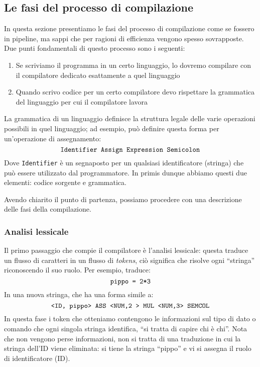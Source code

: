 \documentclass[class=book, crop=false, oneside, 12pt]{standalone}
\begin{document}
\subsection{Le fasi del processo di compilazione}
In questa sezione presentiamo le fasi del processo di compilazione come se fossero in pipeline, ma sappi che per ragioni di efficienza vengono spesso sovrapposte. Due punti fondamentali di questo processo sono i seguenti:
\begin{enumerate}
    \item Se scriviamo il programma in un certo linguaggio, lo dovremo compilare con il compilatore dedicato esattamente a quel linguaggio
    \item Quando scrivo codice per un certo compilatore devo rispettare la grammatica del linguaggio per cui il compilatore lavora
\end{enumerate}
La grammatica di un linguaggio definisce la struttura legale delle varie operazioni possibili in quel linguaggio; ad esempio, può definire questa forma per un’operazione di assegnamento:
\begin{equation*}
	\textrm{\texttt{Identifier Assign Expression Semicolon}}
\end{equation*}
Dove \texttt{Identifier} è un segnaposto per un qualsiasi identificatore (stringa) che può essere utilizzato dal programmatore.
In primis dunque abbiamo questi due elementi: codice sorgente e grammatica.

Avendo chiarito il punto di partenza, possiamo procedere con una descrizione delle fasi della compilazione.

\subsubsection{Analisi lessicale}
Il primo passaggio che compie il compilatore è l’analisi lessicale: questa traduce un flusso di caratteri in un flusso di \emph{tokens}, ciò significa che risolve ogni “stringa” riconoscendo il suo ruolo. Per esempio, traduce:
\begin{equation*}
	\textrm{\texttt{pippo = 2*3}}
\end{equation*}
In una nuova stringa, che ha una forma simile a:
\begin{equation*}
	\textrm{\texttt{<ID, pippo> ASS <NUM,2 > MUL <NUM,3> SEMCOL}}
\end{equation*}
In questa fase i token che otteniamo contengono le informazioni sul tipo di dato o comando che ogni singola stringa identifica,  “si tratta di capire chi è chi”. Nota che non vengono perse informazioni, non si tratta di una traduzione in cui la stringa dell’ID viene eliminata: si tiene la stringa “pippo” e vi si assegna il ruolo di identificatore (ID).
\end{document}
